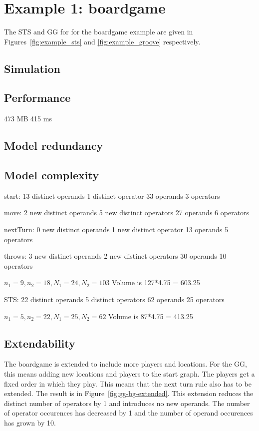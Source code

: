 \section{Example 1: boardgame}
The STS and GG for for the boardgame example are given in Figures~\ref{fig:example_sts} and \ref{fig:example_groove} respectively. 

\subsection{Simulation}

\subsection{Performance}
473 MB 415 ms

\subsection{Model redundancy}

\subsection{Model complexity}
start:
13 distinct operands
1 distinct operator
33 operands
3 operators

move:
2 new distinct operands
5 new distinct operators
27 operands
6 operators

nextTurn:
0 new distinct operands
1 new distinct operator
13 operands
5 operators

throws:
3 new distinct operands
2 new distinct operators
30 operands
10 operators

$n_1 = 9, n_2 = 18, N_1 = 24, N_2 = 103$ Volume is 127*4.75 = 603.25

STS:
22 distinct operands
5 distinct operators
62 operands
25 operators

$n_1 = 5, n_2 = 22, N_1 = 25, N_2 = 62$ Volume is 87*4.75 = 413.25


\subsection{Extendability}
The boardgame is extended to include more players and locations. For the GG, this means adding new locations and players to the start graph. The players get a fixed order in which they play. This means that the next turn rule also has to be extended. The result is in Figure~\ref{fig:gg-bg-extended}. This extension reduces the distinct number of operators by 1 and introduces no new operands. The number of operator occurences has decreased by 1 and the number of operand occurences has grown by 10.

